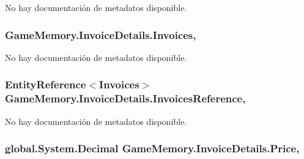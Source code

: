 No hay documentación de metadatos disponible. 

\hypertarget{class_game_memory_1_1_invoice_details_a992833a86798d5b67073419b0106d7ec}{
\subsubsection[{Invoices}]{ Game\-Memory.\-Invoice\-Details.\-Invoices\hspace{0.3cm}{\ttfamily [get]}, {\ttfamily [set]}}}\label{class_game_memory_1_1_invoice_details_a992833a86798d5b67073419b0106d7ec}


No hay documentación de metadatos disponible. 

\hypertarget{class_game_memory_1_1_invoice_details_addfc996d0bd6283ba9558d5f84a8c781}{
\subsubsection[{Invoices\-Reference}]{\setlength{\rightskip}{0pt plus 5cm}Entity\-Reference$<${\bf Invoices}$>$ Game\-Memory.\-Invoice\-Details.\-Invoices\-Reference\hspace{0.3cm}{\ttfamily [get]}, {\ttfamily [set]}}}\label{class_game_memory_1_1_invoice_details_addfc996d0bd6283ba9558d5f84a8c781}


No hay documentación de metadatos disponible. 

\hypertarget{class_game_memory_1_1_invoice_details_a4022db9ebe3d673e24f09290d966ff5e}{
\subsubsection[{Price}]{\setlength{\rightskip}{0pt plus 5cm}global.\-System.\-Decimal Game\-Memory.\-Invoice\-Details.\-Price\hspace{0.3cm}{\ttfamily [get]}, {\ttfamily [set]}}}\label{class_game_memory_1_1_invoice_details_a4022db9ebe3d673e24f09290d966ff5e}


